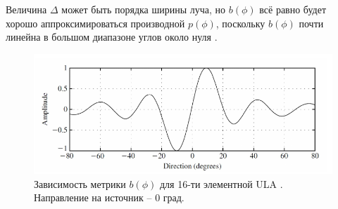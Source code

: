 Величина $\Delta$ может быть порядка ширины луча, но  $b(\phi)$ всё равно будет
хорошо аппроксимироваться производной $p(\phi)$, поскольку $b(\phi)$ почти
линейна в большом диапазоне углов около нуля \cite{Tuncer2009}.  

\begin{figure}[h]
    \centering
    \includegraphics[width=\linewidth]{figs/fig3.11}
    \caption{Зависимость метрики $b(\phi)$ для 16-ти элементной ULA \cite{Tuncer2009}. Направление на источник -- 0 град.}
    \label{fig:3.11}
\end{figure}


